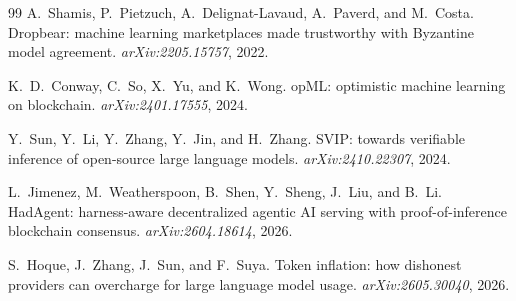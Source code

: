 \documentclass[11pt]{article}
\begin{document}
\begin{thebibliography}{99}
A.~Shamis, P.~Pietzuch, A.~Delignat-Lavaud, A.~Paverd, and
M.~Costa.
Dropbear: machine learning marketplaces made trustworthy with
Byzantine model agreement.
\emph{arXiv:2205.15757}, 2022.

K.~D.~Conway, C.~So, X.~Yu, and K.~Wong.
opML: optimistic machine learning on blockchain.
\emph{arXiv:2401.17555}, 2024.

Y.~Sun, Y.~Li, Y.~Zhang, Y.~Jin, and H.~Zhang.
SVIP: towards verifiable inference of open-source large language
models.
\emph{arXiv:2410.22307}, 2024.

L.~Jimenez, M.~Weatherspoon, B.~Shen, Y.~Sheng, J.~Liu, and
B.~Li.
HadAgent: harness-aware decentralized agentic AI serving with
proof-of-inference blockchain consensus.
\emph{arXiv:2604.18614}, 2026.

S.~Hoque, J.~Zhang, J.~Sun, and F.~Suya.
Token inflation: how dishonest providers can overcharge for large
language model usage.
\emph{arXiv:2605.30040}, 2026.

\end{thebibliography}
\end{document}
